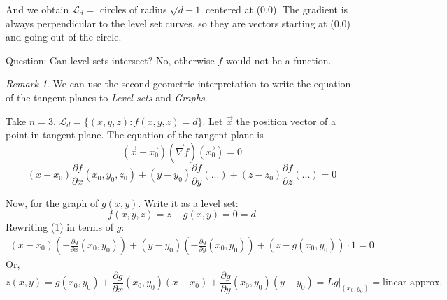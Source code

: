 \documentclass[12pt]{book}
\theoremstyle{definition}
\theoremstyle{remark}
\newtheorem*{remark}{Remark}
\begin{document}
\begin{enumerate}
\begin{example}
          And we obtain $\mathcal{L}_d = $ circles of radius $\sqrt{d-1}$ centered at (0,0). The gradient is always perpendicular to the level set curves, so they are vectors starting at (0,0) and going out of the circle. 
          \begin{center}
          \end{center}
        \end{example}
        

      \end{enumerate}
    Question: Can level sets intersect? No, otherwise $f$ would not be a function.  
    \begin{remark}
      We can use the second geometric interpretation to write the equation of the tangent planes to \textit{Level sets} and \textit{Graphs}. 
    \end{remark} 
    \begin{example}
      Take $n = 3$, $\mathcal{L}_d = \{ (x,y,z) : f(x,y,z) = d  \}$. Let $\vec{{x}}$ the position vector of a point in tangent plane. The equation of the tangent plane is 
      $$(\vec{{x}} -\vec{{x_0}})(\vec{{\nabla}}f)(\vec{{x_0}} )=0$$
      \begin{equation}(x- x_0) \frac{\partial {f}}{\partial {x}} (x_0, y_0, z_0)+ (y-y_0)\frac{\partial {f}}{\partial {y}} (...)+ (z-z_0) \frac{\partial {f}}{\partial {z}} (...) = 0 \end{equation}
    \end{example}

    \begin{example}Now, for the graph of $g(x,y)$. Write it as a level set: 
      $$f(x,y,z) = z - g(x,y) = 0 = d$$
      Rewriting (1) in terms of $g$:
      \begin{equation*}
        \begin{split}
          (x-x_0)\left( -  \frac{\partial {g}}{\partial {x}} (x_0, y_0) \right)+ (y-y_0) \left(- \frac{\partial {g}}{\partial {y}} (x_0, y_0)  \right) + (z - g(x_0 , y_0))\cdot 1 = 0 
        \end{split}
      \end{equation*}
      Or, $$z(x,y) = g(x_0, y_0) + \frac{\partial {g}}{\partial {x}} (x_0,y_0)(x-x_0) + \frac{\partial {g}}{\partial {y}} (x_0, y_0 ) (y-y_0) = Lg|_{(x_0, y_0)} = \text{linear approx.} $$
       
    \end{example}
\end{document}
